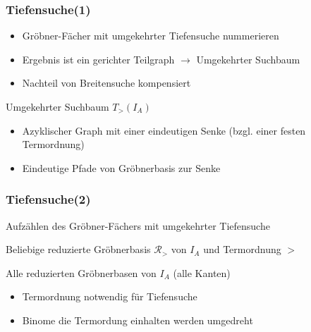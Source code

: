 \documentclass{beamer}
\newcommand{\Input}{\item[\algorithmicinput]}
\newcommand{\algorithmicinput}{\textbf{Input:}}
\newcommand{\Output}{\item[\algorithmicoutput]}
\newcommand{\algorithmicoutput}{\textbf{Output:}}
\begin{document}

\begin{frame}[<+->][fragile]
\frametitle{Tiefensuche(1)}

\begin{itemize}
\item Gröbner-Fächer mit umgekehrter Tiefensuche nummerieren
\item Ergebnis ist ein gerichter Teilgraph $\longrightarrow$ Umgekehrter Suchbaum 
\item Nachteil von Breitensuche kompensiert

\end{itemize}

\begin{block}{Umgekehrter Suchbaum $T_{>}(I_{A})$}
\begin{itemize}
\item Azyklischer Graph mit einer eindeutigen Senke (bzgl. einer festen Termordnung)
\item Eindeutige Pfade von Gröbnerbasis zur Senke
\end{itemize}

\end{block}
 
\end{frame}



\begin{frame}[fragile]
\frametitle{Tiefensuche(2)}


\begin{algorithm}[H]
\caption{Aufzählen des Gröbner-Fächers mit umgekehrter Tiefensuche}

\begin{algorithmic}[1]

\Input
Beliebige reduzierte Gröbnerbasis  $ \mathcal{R}_{>} $ von $I_A$ und Termordnung $>$

\Output
Alle reduzierten Gröbnerbasen von $I_A$ (alle Kanten) 


\end{algorithmic}
\end{algorithm}

\begin{itemize}
\item Termordnung notwendig für Tiefensuche
\item Binome die Termordung einhalten werden \glqq umgedreht\grqq
\end{itemize}

 
\end{frame}
\end{document}
